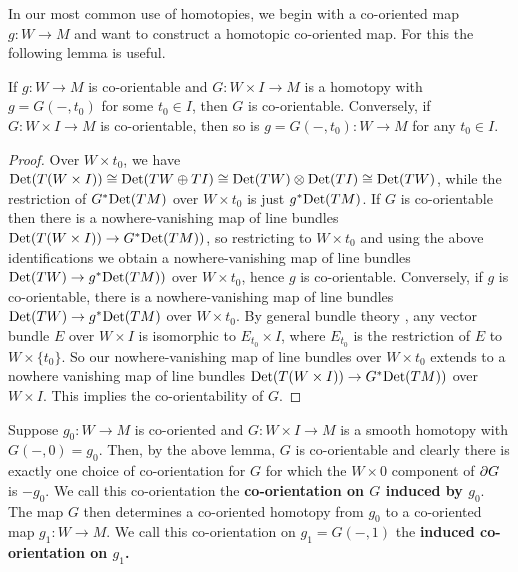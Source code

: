 In our most common use of homotopies, we begin with a co-oriented map $g \colon W \to M$ and want to construct a homotopic co-oriented map.
For this the following lemma is useful.

\begin{lemma}\label{L: co-orientable homotopies}
	If $g \colon W \to M$ is co-orientable and $G \colon W \times I \to M$ is a homotopy with $g = G(-,t_0)$ for some $t_0 \in I$, then $G$ is co-orientable.
	Conversely, if $G \colon W \times I \to M$ is co-orientable, then so is $g = G(-,t_0) \colon W \to M$ for any $t_0 \in I$.
\end{lemma}

\begin{proof}
	Over $W \times t_0$, we have ${\rm Det}(T(W \times I)) \cong {\rm Det}(TW \oplus TI) \cong {\rm Det}(TW) \otimes {\rm Det} (TI) \cong {\rm Det}(TW)$, while the restriction of $G^*{\rm Det}(TM)$ over $W \times t_0$ is just $g^*{\rm Det}(TM)$.
	If $G$ is co-orientable then there is a nowhere-vanishing map of line bundles ${\rm Det}(T(W \times I)) \to G^*{\rm Det}(TM))$, so restricting to $W \times t_0$ and using the above identifications we obtain a nowhere-vanishing map of line bundles ${\rm Det}(TW) \to g^*{\rm Det}(TM))$ over $W \times t_0$, hence $g$ is co-orientable.
	Conversely,
	if $g$ is co-orientable, there is a nowhere-vanishing map of line bundles ${\rm Det}(TW) \to g^*{\rm Det}(TM)$ over $W \times t_0$.
	By general bundle theory \cite[Theorem 3.4.4]{Hus94}, any vector bundle $E$ over $W \times I$ is isomorphic to $E_{t_0} \times I$, where $E_{t_0}$ is the restriction of $E$ to $W \times \{t_0\}$.
	So our nowhere-vanishing map of line bundles over $W \times t_0$ extends to a nowhere vanishing map of line bundles ${\rm Det}(T(W \times I)) \to G^*{\rm Det}(TM))$ over $W \times I$.
	This implies the co-orientability of $G$.
\end{proof}

\begin{definition}\label{D: homotopy co-orientation}
	Suppose $g_0 \colon W \to M$ is co-oriented and $G \colon W \times I \to M$ is a smooth homotopy with $G(-,0) = g_0$.
	Then, by the above lemma, $G$ is co-orientable and clearly there is exactly one choice of co-orientation for $G$ for which the $W \times 0$ component of $\partial G$ is $-g_0$.
	We call this co-orientation the \textbf{co-orientation on $G$ induced by $g_0$}.
	The map $G$ then determines a co-oriented homotopy from $g_0$ to a co-oriented map $g_1 \colon W \to M$.
	We call this co-orientation on $g_1 = G(-,1)$ the \textbf{induced co-orientation on $g_1$.}
\end{definition}


